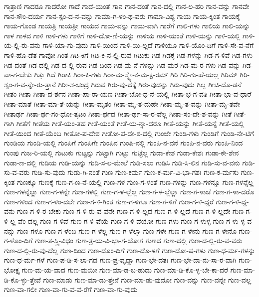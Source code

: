 {ಗಾತ್ರಾಣಿ
ಗಾದರೂ
ಗಾದರೋ
ಗಾದೆ
ಗಾದೆ-ಯಂತೆ
ಗಾನ
ಗಾನ-ದಂತೆ
ಗಾನ-ದಲ್ಲಿ
ಗಾನ-ಲ-ಹರಿ
ಗಾನ-ವನ್ನು
ಗಾನವೇ
ಗಾನ-ಸೌಂ-ದರ್ಯ
ಗಾನ-ಸ್ಪಂ-ದ-ನ-ವನ್ನು
ಗಾಮಾ-ಗ-ಳಂ-ಥ-ವರು
ಗಾಮಾ-ವಿಶ್ಯ
ಗಾಯ
ಗಾಯ-ಕ್ಕಿಂತ
ಗಾಯಕ್ಕೆ
ಗಾಯ-ಗೊಂಡ
ಗಾಯತ್ರಿ
ಗಾಯತ್ರೀ
ಗಾಯದ
ಗಾಯ-ವನ್ನು
ಗಾಯ-ವಾಗಿ
ಗಾರೆಗೆ
ಗಾಲಿ-ಗಳು
ಗಾಲಿಯ
ಗಾಲಿ-ಯನ್ನು
ಗಾಳ
ಗಾಳದ
ಗಾಳಿ
ಗಾಳಿ-ಗಳು
ಗಾಳಿಗೆ
ಗಾಳಿ-ದೋ-ಣಿ-ಯನ್ನು
ಗಾಳಿಯ
ಗಾಳಿ-ಯಂತೆ
ಗಾಳಿ-ಯನ್ನು
ಗಾಳಿ-ಯಲ್ಲಿ
ಗಾಳಿ-ಯ-ಲ್ಲಿ-ರು-ವನು
ಗಾಳಿ-ಯಾ-ಗು-ವುದು
ಗಾಳಿ-ಯಿಂದ
ಗಾಳಿ-ಯಿ-ಲ್ಲದೆ
ಗಾಳಿಯೂ
ಗಾಳಿ-ಯೊಂ-ದಿಗೆ
ಗಾಳಿ-ಸೇ-ವ-ನೆಗೆ
ಗಾಳಿ-ಹೊ-ಡೆತ
ಗಾವೋ
ಗಿಂತ
ಗಿಟ-ಕಿಗೆ
ಗಿಟ-ಕಿ-ನ-ಲ್ಲಿ-ರುವ
ಗಿಟುಕು
ಗಿಡ
ಗಿಡಕ್ಕೆ
ಗಿಡ-ಗಳನ್ನು
ಗಿಡ-ಗ-ಳಿವೆ
ಗಿಡ-ಗಳು
ಗಿಡ-ದಂತೆ
ಗಿಡ-ದಲ್ಲಿ
ಗಿಡ-ದ-ಲ್ಲಿ-ರುವ
ಗಿಡ-ದಿಂದ
ಗಿಡ-ಮ-ನೆ-ಗಳನ್ನು
ಗಿಡ-ಮರ
ಗಿಡ-ಮ-ರ-ಗಳು
ಗಿಡ-ವನ್ನು
ಗಿಡ-ವಾ-ಗ-ಬೇಕು
ಗಿತ್ತು
ಗಿದೆ
ಗಿರಾಕಿ
ಗಿರಾ-ಕಿ-ಗಳು
ಗಿರಾ-ಮ-ಸ್ಮ್ಯೇ-ಕ-ಮ-ಕ್ಷ-ರಮ್
ಗಿರಿ
ಗಿರಿ-ಗು-ಹೆ-ಯಲ್ಲ
ಗಿರಿಮ್
ಗಿರಿ-ಶೃಂ-ಗ-ವ-ನ್ನೇ-ರು-ತ್ತಾನೆ
ಗಿರೀ-ಶ-ಚಂದ್ರ
ಗಿರುವ
ಗಿರು-ವು-ದಕ್ಕೆ
ಗಿರು-ವುದನ್ನು
ಗಿರು-ವುದು
ಗಿಲ್ಲ
ಗೀಚಿ-ದೊ-ಡನೆ
ಗೀತಂ
ಗೀತಾ
ಗೀತಾ-ದ-ರ್ಶನ
ಗೀತಾ-ಪಾ-ರಾ-ಯಣ
ಗೀತಾ-ಬೋ-ಧ-ನೆ-ಯಲ್ಲಿ
ಗೀತಾ-ಭ-ಗ-ವತಿ
ಗೀತಾ-ಭಾ-ವ-ಧಾರೆ
ಗೀತಾ-ಮಾತೆ
ಗೀತಾ-ಮಾ-ತೆ-ಯನ್ನು
ಗೀತಾ-ಮೃತಂ
ಗೀತಾ-ಮೃ-ತ-ದುಹೇ
ಗೀತಾ-ಮೃ-ತ-ವನ್ನು
ಗೀತಾ-ಮೃ-ತವೇ
ಗೀತಾರ್ಥ
ಗೀತಾ-ರ್ಥ-ಗಂ-ಧೋ-ತ್ಕಟಂ
ಗೀತಾ-ರ್ಥದ
ಗೀತಾ-ರ್ಥ-ಸಾ-ರ-ವೆಲ್ಲ
ಗೀತಾ-ಸಂ-ದೇ-ಶ-ವನ್ನು
ಗೀತೆ
ಗೀತೆ-ಗಾಗಿ
ಗೀತೆಗೆ
ಗೀತೆಯ
ಗೀತೆ-ಯಂ-ತಹ
ಗೀತೆ-ಯಂತೆ
ಗೀತೆ-ಯ-ನ್ನಾ-ದರೂ
ಗೀತೆ-ಯನ್ನು
ಗೀತೆ-ಯನ್ನೆ
ಗೀತೆ-ಯಲ್ಲಿ
ಗೀತೆ-ಯಿಂದ
ಗೀತೆ-ಯೆಂಬ
ಗೀತೋ-ಪ-ದೇಶ
ಗೀತೋ-ಪ-ದೇ-ಶ-ದಲ್ಲಿ
ಗುಂಜೇ
ಗುಂಡಿ-ಗಳು
ಗುಂಡಿಗೆ
ಗುಂಡಿ-ನೇ-ಟಿಗೆ
ಗುಂಡಿಯ
ಗುಂಡಿ-ಯಲ್ಲಿ
ಗುಂಪಿಗೆ
ಗುಂಪಿಗೇ
ಗುಂಪಿನ
ಗುಂಪಿ-ನಲ್ಲಿ
ಗುಂಪಿ-ನ-ವನೆ
ಗುಂಪಿ-ನ-ವರು
ಗುಂಪಿ-ನಿಂದ
ಗುಂಪು
ಗುಜ-ರಿ-ಯಲ್ಲಿ
ಗುಟುಕು
ಗುಟ್ಟನ್ನು
ಗುಟ್ಟಾಗಿ
ಗುಟ್ಟು
ಗುಟ್ಟೆಲ್ಲ
ಗುಡಾ-ಕೇಶ
ಗುಡಾ-ಕೇಶಃ
ಗುಡಾ-ಕೇ-ಶೇನ
ಗುಡಾ-ಣ-ದಲ್ಲಿ
ಗುಡಿಯ
ಗುಡಿ-ಯನ್ನು
ಗುಡಿ-ಸ-ಲ-ಮೇಲೆ
ಗುಡಿ-ಸಲು
ಗುಡಿಸಿ
ಗುಡಿ-ಸಿ-ಲಿನ
ಗುಡಿ-ಸು-ವ-ವನು
ಗುಡಿ-ಸು-ವ-ವರು
ಗುಡಿ-ಸು-ವುದು
ಗುಡು-ಗಿ-ನಂತೆ
ಗುಣ
ಗುಣ-ಕರ್ಮ
ಗುಣ-ಕ-ರ್ಮ-ವಿ-ಭಾ-ಗಶಃ
ಗುಣ-ಕ-ರ್ಮಸು
ಗುಣ-ಕ್ಕಿಂತ
ಗುಣಕ್ಕೂ
ಗುಣಕ್ಕೆ
ಗುಣ-ಗ-ಣ-ನೆ-ಯಲ್ಲಿ
ಗುಣ-ಗಳ
ಗುಣ-ಗ-ಳಂತೆ
ಗುಣ-ಗಳನ್ನು
ಗುಣ-ಗಳನ್ನೂ
ಗುಣ-ಗಳನ್ನೆಲ್ಲ
ಗುಣ-ಗಳನ್ನೆಲ್ಲಾ
ಗುಣ-ಗ-ಳನ್ನೇ
ಗುಣ-ಗಳಲ್ಲಿ
ಗುಣ-ಗ-ಳ-ಲ್ಲೆಲ್ಲ
ಗುಣ-ಗ-ಳ-ಲ್ಲೆಲ್ಲಾ
ಗುಣ-ಗ-ಳಾಚೆ
ಗುಣ-ಗ-ಳಾ-ದರೊ
ಗುಣ-ಗಳಿಂದ
ಗುಣ-ಗ-ಳಿಂ-ದಲೇ
ಗುಣ-ಗ-ಳಿ-ಗಿಂತ
ಗುಣ-ಗ-ಳಿಗೂ
ಗುಣ-ಗ-ಳಿಗೆ
ಗುಣ-ಗ-ಳಿ-ದ್ದರೆ
ಗುಣ-ಗ-ಳಿ-ದ್ದ-ವನು
ಗುಣ-ಗ-ಳಿ-ರ-ಬೇಕು
ಗುಣ-ಗ-ಳಿ-ರು-ವ-ವನೇ
ಗುಣ-ಗ-ಳಿ-ಲ್ಲದ
ಗುಣ-ಗ-ಳಿ-ಲ್ಲದೆ
ಗುಣ-ಗ-ಳಿ-ಲ್ಲದೇ
ಗುಣ-ಗ-ಳಿ-ಲ್ಲ-ವೆಂ-ದಲ್ಲ
ಗುಣ-ಗ-ಳಿವೆ
ಗುಣ-ಗ-ಳಿ-ವೆಯೆ
ಗುಣ-ಗ-ಳಿ-ವೆಯೋ
ಗುಣ-ಗಳು
ಗುಣ-ಗ-ಳುಳ್ಳ
ಗುಣ-ಗ-ಳು-ಳ್ಳ-ವ-ನನ್ನು
ಗುಣ-ಗಳೂ
ಗುಣ-ಗ-ಳೆಂಬ
ಗುಣ-ಗ-ಳೆಲ್ಲ
ಗುಣ-ಗ-ಳೆಲ್ಲಾ
ಗುಣ-ಗಳೇ
ಗುಣ-ಗ-ಳೇನು
ಗುಣ-ಗ-ಳೇನೊ
ಗುಣ-ಗ-ಳೊಂ-ದಿಗೆ
ಗುಣ-ತ-ಸ್ತ್ರಿ-ವಿಧಂ
ಗುಣ-ತ್ರ-ಯ-ವಿ-ಭಾ-ಗ-ಯೋಗ
ಗುಣದ
ಗುಣ-ದಲ್ಲಿ
ಗುಣ-ದ-ಲ್ಲಿ-ರು-ವ-ವರು
ಗುಣ-ದ-ಲ್ಲಿ-ರು-ವು-ದೆಲ್ಲ
ಗುಣ-ದಿಂದ
ಗುಣ-ದೊಂ-ದಿಗೆ
ಗುಣ-ದೊ-ಳಗೆ
ಗುಣ-ದೋ-ಷ-ಗಳು
ಗುಣ-ಧ-ರ್ಮ-ಗಳನ್ನು
ಗುಣ-ಧ-ರ್ಮ-ಗಳೆ
ಗುಣ-ಪ-ಡಿ-ಸ-ಲಾ-ಗದ
ಗುಣ-ಪ್ರ-ವೃದ್ಧಾ
ಗುಣ-ಭೇ-ದತಃ
ಗುಣ-ಭೇ-ದಾ-ನು-ಸಾ-ರ-ವಾಗಿ
ಗುಣ-ಭೋಕ್ತೃ
ಗುಣ-ಮ-ಯ-ವಾದ
ಗುಣ-ಮಯೀ
ಗುಣ-ಮಾ-ಡ-ಬ-ಹುದು
ಗುಣ-ಮಾ-ಡಿ-ಕೊ-ಳ್ಳ-ಬೇ-ಕಾ-ದರೆ
ಗುಣ-ಮಾ-ಡಿ-ಕೊ-ಳ್ಳು-ತ್ತೇವೆ
ಗುಣ-ಮಾಡು
ಗುಣ-ಮಾ-ಡು-ತ್ತೇನೆ
ಗುಣ-ಮಾ-ಡು-ವುದೋ
ಗುಣ-ವನ್ನು
ಗುಣ-ವನ್ನೇ
ಗುಣ-ವಲ್ಲ
ಗುಣ-ವಾ-ಗಲೀ
ಗುಣ-ವಾ-ಗು-ವ-ವ-ರೆಗೆ
ಗುಣ-ವಾ-ಗು-ವುದು
}
